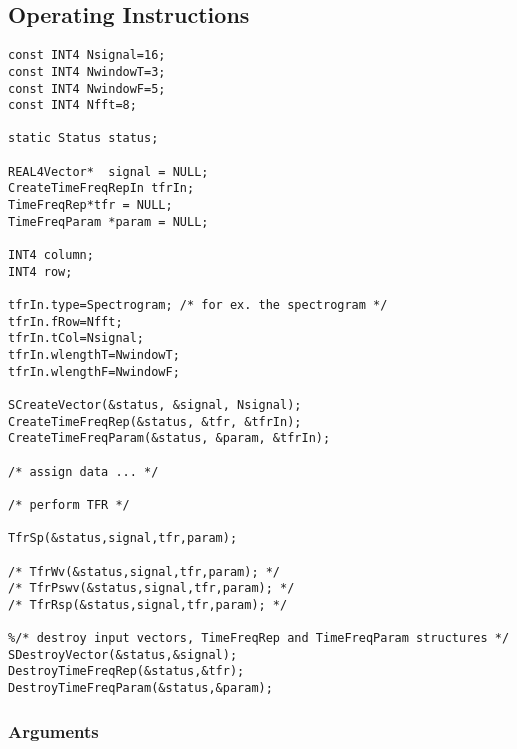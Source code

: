 \documentclass{article}
\begin{document}
\subsection{Operating Instructions}


\begin{verbatim}
const INT4 Nsignal=16;
const INT4 NwindowT=3;
const INT4 NwindowF=5;
const INT4 Nfft=8;

static Status status;

REAL4Vector*  signal = NULL;
CreateTimeFreqRepIn tfrIn;
TimeFreqRep*tfr = NULL;
TimeFreqParam *param = NULL;

INT4 column;
INT4 row;

tfrIn.type=Spectrogram; /* for ex. the spectrogram */
tfrIn.fRow=Nfft;
tfrIn.tCol=Nsignal;
tfrIn.wlengthT=NwindowT;
tfrIn.wlengthF=NwindowF;

SCreateVector(&status, &signal, Nsignal);
CreateTimeFreqRep(&status, &tfr, &tfrIn);
CreateTimeFreqParam(&status, &param, &tfrIn);

/* assign data ... */

/* perform TFR */

TfrSp(&status,signal,tfr,param);

/* TfrWv(&status,signal,tfr,param); */
/* TfrPswv(&status,signal,tfr,param); */
/* TfrRsp(&status,signal,tfr,param); */

%/* destroy input vectors, TimeFreqRep and TimeFreqParam structures */
SDestroyVector(&status,&signal);
DestroyTimeFreqRep(&status,&tfr);
DestroyTimeFreqParam(&status,&param);
\end{verbatim}

\subsubsection{Arguments}

\end{document}
